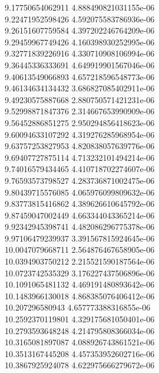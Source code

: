 {9.17750654062911 4.888490821031155e-06 \\
9.22471952598426 4.592075583786936e-06 \\
9.26151607759584 4.397202246764209e-06 \\
9.29459967749426 4.160398930252995e-06 \\
9.32771839226916 4.330710908106994e-06 \\
9.36445336333691 4.649919901567046e-06 \\
9.40613549066893 4.657218596548773e-06 \\
9.46134634134432 3.686827085402911e-06 \\
9.49230575887668 2.880750571421231e-06 \\
9.52998871847376 2.314667653990909e-06 \\
9.56452886851275 2.950294856418623e-06 \\
9.60094633107292 4.319276285968954e-06 \\
9.63757253827953 4.820838057639776e-06 \\
9.69407727875114 4.713232101494214e-06 \\
9.74016579434465 4.410718702274607e-06 \\
9.76593573798527 4.283736871002475e-06 \\
9.80439715576085 4.065976099809632e-06 \\
9.83773815416862 4.389626610645792e-06 \\
9.87459047002449 4.663344043365214e-06 \\
9.92342945398741 4.482086296775378e-06 \\
9.97106479239937 3.391567815924645e-06 \\
10.0047079668711 2.564876467658905e-06 \\
10.0394903750212 2.215521590187564e-06 \\
10.0723742535329 3.176227437506896e-06 \\
10.1091065481132 4.469191480893642e-06 \\
10.1483966130018 4.868385076406412e-06 \\
10.207296580943 4.657773388316855e-06 \\
10.2592370119801 4.329175681050401e-06 \\
10.2793593648248 4.214795808366034e-06 \\
10.3165081897087 4.088926743861521e-06 \\
10.3513167445208 4.457353952602716e-06 \\
10.3867925924078 4.622975666279672e-06 \\
}
